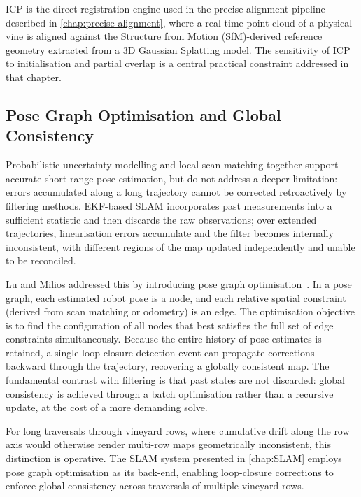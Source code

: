 ICP is the direct registration engine used in the precise-alignment pipeline described in \cref{chap:precise-alignment}, where a real-time point cloud of a physical vine is aligned against the Structure from Motion (SfM)-derived reference geometry extracted from a 3D Gaussian Splatting model. The sensitivity of ICP to initialisation and partial overlap is a central practical constraint addressed in that chapter.

\subsection{Pose Graph Optimisation and Global Consistency}
\label{subsec:pose-graph-optimisation}

Probabilistic uncertainty modelling and local scan matching together support accurate short-range pose estimation, but do not address a deeper limitation: errors accumulated along a long trajectory cannot be corrected retroactively by filtering methods. EKF-based SLAM incorporates past measurements into a sufficient statistic and then discards the raw observations; over extended trajectories, linearisation errors accumulate and the filter becomes internally inconsistent, with different regions of the map updated independently and unable to be reconciled.

Lu and Milios addressed this by introducing pose graph optimisation~\cite{luGloballyConsistentRange1997}. In a pose graph, each estimated robot pose is a node, and each relative spatial constraint (derived from scan matching or odometry) is an edge. The optimisation objective is to find the configuration of all nodes that best satisfies the full set of edge constraints simultaneously. Because the entire history of pose estimates is retained, a single loop-closure detection event can propagate corrections backward through the trajectory, recovering a globally consistent map. The fundamental contrast with filtering is that past states are not discarded: global consistency is achieved through a batch optimisation rather than a recursive update, at the cost of a more demanding solve.

For long traversals through vineyard rows, where cumulative drift along the row axis would otherwise render multi-row maps geometrically inconsistent, this distinction is operative. The SLAM system presented in \cref{chap:SLAM} employs pose graph optimisation as its back-end, enabling loop-closure corrections to enforce global consistency across traversals of multiple vineyard rows.

